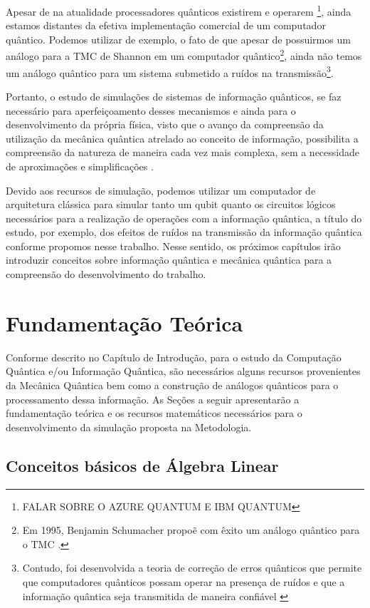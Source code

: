\documentclass[11pt,oneside,brazil,hidelinks,article,sumario=tradicional,a4paper]{abntex2}
\begin{document}
Apesar de na atualidade processadores quânticos existirem e operarem \footnote{FALAR SOBRE O AZURE QUANTUM E IBM QUANTUM}, ainda estamos distantes da efetiva implementação comercial de um computador quântico. Podemos utilizar de exemplo, o fato de que apesar de possuirmos um análogo para a TMC de Shannon em um computador quântico\footnote{Em 1995, Benjamin Schumacher propoẽ com êxito um análogo quântico para o TMC \cite{benschu}.}, ainda não temos um análogo quântico para um sistema submetido a ruídos na transmissão\footnote{Contudo, foi desenvolvida a teoria de correção de erros quânticos que permite que computadores quânticos possam operar na presença de ruídos e que a informação quântica seja transmitida de maneira confiável \cite{chuang}}\cite{chuang}.

Portanto, o estudo de simulações de sistemas de informação quânticos, se faz necessário para aperfeiçoamento desses mecanismos e ainda para o desenvolvimento da própria física, visto que o avanço da compreensão da utilização da mecânica quântica atrelado ao conceito de informação, possibilita a compreensão da natureza de maneira cada vez mais complexa, sem a necessidade de aproximações e simplificações \cite{chuang}.

Devido aos recursos de simulação, podemos utilizar um computador de arquitetura clássica para simular tanto um qubit quanto os circuitos lógicos necessários para a realização de operações com a informação quântica, a título do estudo, por exemplo, dos efeitos de ruídos na transmissão da informação quântica conforme propomos nesse trabalho. Nesse sentido, os próximos capítulos irão introduzir conceitos sobre informação quântica e mecânica quântica para a compreensão do desenvolvimento do trabalho.

\section{Fundamentação Teórica}

Conforme descrito no Capítulo de Introdução, para o estudo da Computação Quântica e/ou Informação Quântica, são necessários alguns recursos provenientes da Mecânica Quântica bem como a construção de análogos quânticos para o processamento dessa informação. As Seções a seguir apresentarão a fundamentação teórica e os recursos matemáticos necessários para o desenvolvimento da simulação proposta na Metodologia.

\subsection{Conceitos básicos de Álgebra Linear}
\end{document}
